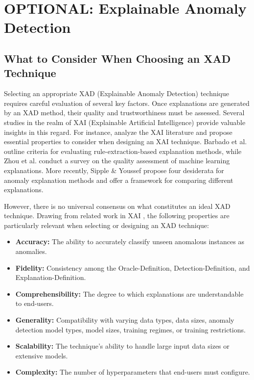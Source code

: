 \section{OPTIONAL: Explainable Anomaly Detection}
\subsection{What to Consider When Choosing an XAD Technique}
Selecting an appropriate XAD (Explainable Anomaly Detection) technique requires careful evaluation of several key factors. Once explanations are generated by an XAD method, their quality and trustworthiness must be assessed. Several studies in the realm of XAI (Explainable Artificial Intelligence) provide valuable insights in this regard. For instance, \cite{ref20, ref76} analyze the XAI literature and propose essential properties to consider when designing an XAI technique. Barbado et al. \cite{ref18} outline criteria for evaluating rule-extraction-based explanation methods, while Zhou et al. \cite{ref229} conduct a survey on the quality assessment of machine learning explanations. More recently, Sipple \& Youssef \cite{ref197} propose four desiderata for anomaly explanation methods and offer a framework for comparing different explanations.

However, there is no universal consensus on what constitutes an ideal XAD technique. Drawing from related work in XAI \cite{Li2023}, the following properties are particularly relevant when selecting or designing an XAD technique:

\begin{itemize}
    \item \textbf{Accuracy:} The ability to accurately classify unseen anomalous instances as anomalies.
    \item \textbf{Fidelity:} Consistency among the Oracle-Definition, Detection-Definition, and Explanation-Definition.
    \item \textbf{Comprehensibility:} The degree to which explanations are understandable to end-users.
    \item \textbf{Generality:} Compatibility with varying data types, data sizes, anomaly detection model types, model sizes, training regimes, or training restrictions.
    \item \textbf{Scalability:} The technique's ability to handle large input data sizes or extensive models.
    \item \textbf{Complexity:} The number of hyperparameters that end-users must configure.
\end{itemize}

